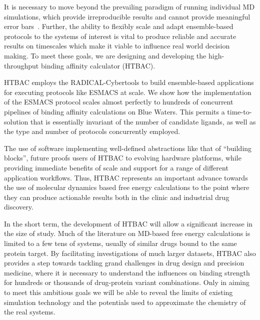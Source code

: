 
It is necessary to move beyond the prevailing paradigm of running individual
MD simulations, which provide irreproducible results and cannot provide
meaningful error bars~\cite{Bhati2017}. Further, the ability to flexibly
scale and adapt ensemble-based protocols to the systems of interest is vital
to produce reliable and accurate results on timescales which make it viable
to influence real world decision making. To meet these goals, we are
designing and developing the high-throughput binding affinity calculator
(HTBAC).

HTBAC employs the RADICAL-Cybertools to build ensemble-based applications for
executing protocols like ESMACS at scale. We show how the implementation of
the ESMACS protocol scales almost perfectly to hundreds of concurrent
pipelines of binding affinity calculations on Blue Waters.
  This permits a time-to-solution that
is essentially invariant of the number
 of candidate
ligands, as well as the type and number of protocols concurrently employed.



The use of software implementing well-defined abstractions like that of
``building blocks'', future proofs users of HTBAC to evolving hardware
platforms, while providing immediate benefits of scale and support for a
range of different application workflows. Thus, HTBAC represents an important
advance towards the use of molecular dynamics based free energy calculations
to the point where they can produce actionable results both in the clinic and
industrial drug discovery.

In the short term, the development of HTBAC will allow a significant increase
in the size of study. Much of the literature on MD-based free energy
calculations is limited to a few tens of systems, usually of similar drugs
bound to the same protein target. By facilitating investigations of much
larger datasets, HTBAC also provides a step towards tackling grand challenges
in drug design and precision medicine, where it is necessary to understand
the influences on binding strength for hundreds or thousands of drug-protein
variant combinations. Only in aiming to meet this ambitious goals we will be
able to reveal the limits of existing simulation technology and the
potentials used to approximate the chemistry of the real systems.

